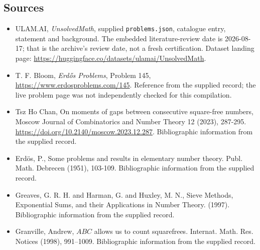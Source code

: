 \documentclass[11pt,a4paper]{article}
\begin{document}
\subsection{Sources}

{\small

\begin{itemize}

\item[\hypertarget{source:statement:1}{S1}] ULAM.AI, \emph{UnsolvedMath}, supplied \texttt{problems.json}, catalogue entry, statement and background. The embedded literature-review date is 2026-08-17; that is the archive’s review date, not a fresh certification. Dataset landing page: \url{https://huggingface.co/datasets/ulamai/UnsolvedMath}.

\item[\hypertarget{source:statement:2}{S2}] T. F. Bloom, \emph{Erdős Problems}, Problem 145, \url{https://www.erdosproblems.com/145}. Reference from the supplied record; the live problem page was not independently checked for this compilation.

\item[\hypertarget{source:statement:3}{S3}] Tsz Ho Chan, On moments of gaps between consecutive square-free numbers, Moscow Journal of Combinatorics and Number Theory 12 (2023), 287-295. \url{https://doi.org/10.2140/moscow.2023.12.287}. Bibliographic information from the supplied record.

\item[\hypertarget{source:statement:4}{S4}] Erd\"{o}s, P., Some problems and results in elementary number theory. Publ. Math. Debrecen (1951), 103-109. Bibliographic information from the supplied record.

\item[\hypertarget{source:statement:5}{S5}] Greaves, G. R. H. and Harman, G. and Huxley, M. N., Sieve Methods, Exponential Sums, and their Applications in Number Theory. (1997). Bibliographic information from the supplied record.

\item[\hypertarget{source:statement:6}{S6}] Granville, Andrew, {$ABC$} allows us to count squarefrees. Internat. Math. Res. Notices (1998), 991--1009. Bibliographic information from the supplied record.

\end{itemize}

}

\label{end:statement}
\end{document}
